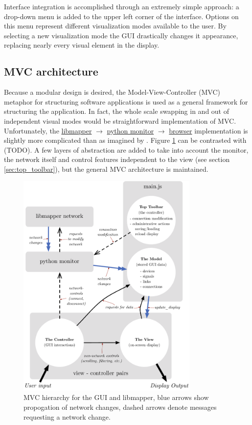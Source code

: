 Interface integration is accomplished through an extremely simple approach: a drop-down menu is added to the upper left corner of the interface. Options on this menu represent different visualization modes available to the user. By selecting a new visualization mode the GUI drastically changes it appearance, replacing nearly every visual element in the display.

	\subsection{MVC architecture} %
	\label{sec:mvc_architecture}

Because a modular design is desired, the Model-View-Controller (MVC) metaphor for structuring software applications \cite{MVC_krasnerpope} is used as a general framework for structuring the application. In fact, the whole scale swapping in and out of independent visual modes would be straightforward implementation of MVC. Unfortunately, the \url{libmapper} $\rightarrow$ \url{python monitor} $\rightarrow$ \url{browser} implementation is slightly more complicated than as imagined by . Figure \ref{fig:mapper_network} can be contrasted with (TODO). A few layers of abstraction are added to take into account the monitor, the network itself and control features independent to the view (see section \ref{sec:top_toolbar}), but the general MVC architecture is maintained.

\begin{figure}[!ht]
\centering
	\includegraphics[width=0.8\textwidth]{figures/mapper_network}
\caption{MVC hierarchy for the GUI and libmapper, blue arrows show propogation of network changes, dashed arrows denote messages requesting a network change.}
\label{fig:mapper_network}
\end{figure}


